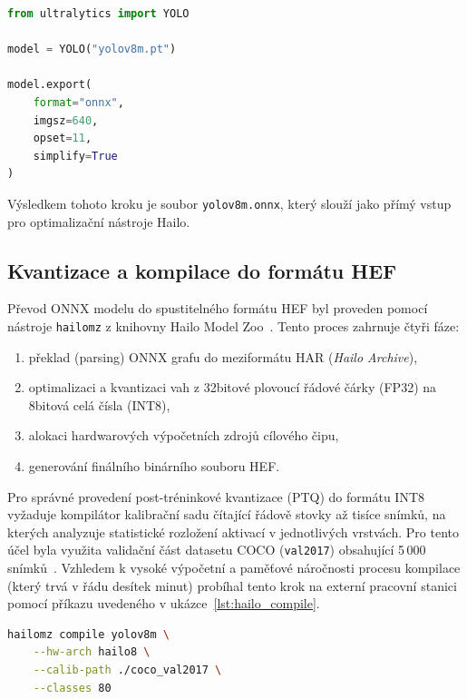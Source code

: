 \documentclass[male,czech,api_bc]{kitheses}
\begin{document}

\begin{lstlisting}[language=Python, caption={Export modelu YOLOv8m do formátu ONNX.}, label={lst:onnx_export}]
from ultralytics import YOLO

model = YOLO("yolov8m.pt")

model.export(
    format="onnx",
    imgsz=640,
    opset=11,
    simplify=True
)
\end{lstlisting}

Výsledkem tohoto kroku je soubor \texttt{yolov8m.onnx}, který slouží jako přímý vstup pro optimalizační nástroje Hailo.

\subsection{Kvantizace a kompilace do formátu HEF}
Převod ONNX modelu do spustitelného formátu HEF byl proveden pomocí nástroje \texttt{hailomz} z knihovny Hailo Model Zoo~\cite{hailo_model_zoo}. Tento proces zahrnuje čtyři fáze:
\begin{enumerate}
    \item překlad (parsing) ONNX grafu do meziformátu HAR (\textit{Hailo Archive}),
    \item optimalizaci a kvantizaci vah z 32bitové plovoucí řádové čárky (FP32) na 8bitová celá čísla (INT8),
    \item alokaci hardwarových výpočetních zdrojů cílového čipu,
    \item generování finálního binárního souboru HEF.
\end{enumerate}

Pro správné provedení post-tréninkové kvantizace (PTQ) do formátu INT8 vyžaduje kompilátor kalibrační sadu čítající řádově stovky až tisíce snímků, na kterých analyzuje statistické rozložení aktivací v jednotlivých vrstvách. Pro tento účel byla využita validační část datasetu COCO (\texttt{val2017}) obsahující 5\,000 snímků~\cite{lin_coco_2014}. Vzhledem k vysoké výpočetní a paměťové náročnosti procesu kompilace (který trvá v řádu desítek minut) probíhal tento krok na externí pracovní stanici pomocí příkazu uvedeného v ukázce~\ref{lst:hailo_compile}.

\begin{lstlisting}[language=bash, caption={Kompilace modelu YOLOv8m pomocí nástroje Hailo Model Zoo.}, label={lst:hailo_compile}]
hailomz compile yolov8m \
    --hw-arch hailo8 \
    --calib-path ./coco_val2017 \
    --classes 80
\end{lstlisting}
\end{document}
